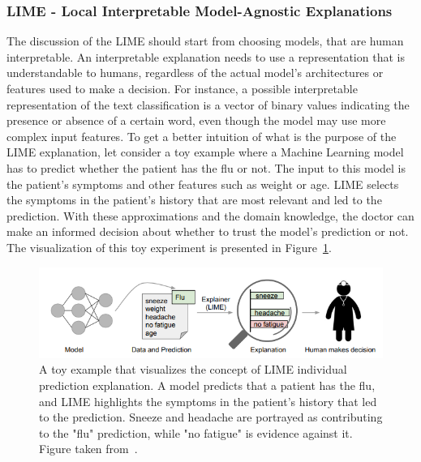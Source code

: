 \subsubsection{LIME - Local Interpretable Model-Agnostic Explanations }
\label{sec:lime}
The discussion of the LIME should start from choosing models, that are human interpretable. An interpretable explanation needs to use a representation that is understandable to humans, regardless of the actual model's architectures or features used to make a decision. For instance, a possible interpretable representation of the text classification is a vector of binary values indicating the presence or absence of a certain word, even though the model may use more complex input features.
To get a better intuition of what is the purpose of the LIME explanation, let consider a toy example where a Machine Learning model has to predict whether the patient has the flu or not. The input to this model is the patient's symptoms and other features such as weight or age. LIME selects the symptoms in the patient's history that are most relevant and led to the prediction. With these approximations and the domain knowledge, the doctor can make an informed decision about whether to trust the model's prediction or not. The visualization of this toy experiment is presented in Figure~\ref{fig:LIME_doctor}.

\begin{figure}[!htb]
\centering
\includegraphics{figures/lime_doctor.PNG}
\caption{A toy example that visualizes the concept of LIME individual prediction explanation. A model predicts that a patient has the flu, and LIME highlights the symptoms in the patient's history that led to the prediction. Sneeze and headache are portrayed as contributing to the "flu" prediction, while "no fatigue" is evidence against it. Figure taken from~\cite{lime}.
\label{fig:LIME_doctor}}
\end{figure} 

